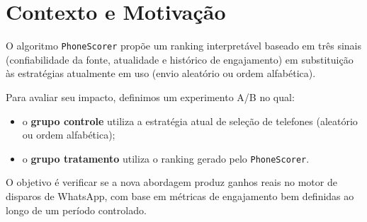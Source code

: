 \section{Contexto e Motivação}

O algoritmo \texttt{PhoneScorer} propõe um ranking interpretável baseado em três sinais
(confiabilidade da fonte, atualidade e histórico de engajamento) em substituição às estratégias
atualmente em uso (envio aleatório ou ordem alfabética).

Para avaliar seu impacto, definimos um experimento A/B no qual:
\begin{itemize}
    \item o \textbf{grupo controle} utiliza a estratégia atual de seleção de telefones (aleatório ou ordem alfabética);
    \item o \textbf{grupo tratamento} utiliza o ranking gerado pelo \texttt{PhoneScorer}.
\end{itemize}

O objetivo é verificar se a nova abordagem produz ganhos reais no motor de disparos de WhatsApp,
com base em métricas de engajamento bem definidas ao longo de um período controlado.
